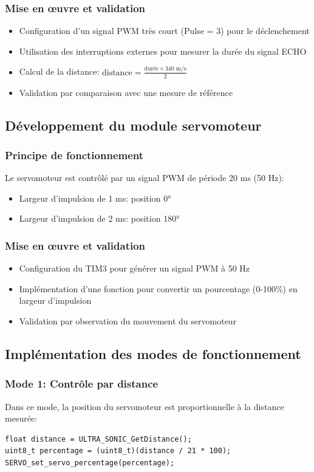 \documentclass{article}
\begin{document}
\subsubsection{Mise en œuvre et validation}
\begin{itemize}
    \item Configuration d'un signal PWM très court (Pulse = 3) pour le déclenchement
    \item Utilisation des interruptions externes pour mesurer la durée du signal ECHO
    \item Calcul de la distance: $\text{distance} = \frac{\text{durée} \times 340 \text{ m/s}}{2}$
    \item Validation par comparaison avec une mesure de référence
\end{itemize}

\subsection{Développement du module servomoteur}
\subsubsection{Principe de fonctionnement}
Le servomoteur est contrôlé par un signal PWM de période 20 ms (50 Hz):
\begin{itemize}
    \item Largeur d'impulsion de 1 ms: position 0°
    \item Largeur d'impulsion de 2 ms: position 180°
\end{itemize}

\subsubsection{Mise en œuvre et validation}
\begin{itemize}
    \item Configuration du TIM3 pour générer un signal PWM à 50 Hz
    \item Implémentation d'une fonction pour convertir un pourcentage (0-100\%) en largeur d'impulsion
    \item Validation par observation du mouvement du servomoteur
\end{itemize}

\subsection{Implémentation des modes de fonctionnement}
\subsubsection{Mode 1: Contrôle par distance}
Dans ce mode, la position du servomoteur est proportionnelle à la distance mesurée:
\begin{lstlisting}[caption={Contrôle par distance}, label={lst:mode1}]
float distance = ULTRA_SONIC_GetDistance();
uint8_t percentage = (uint8_t)(distance / 21 * 100);
SERVO_set_servo_percentage(percentage);
\end{lstlisting}
\end{document}
